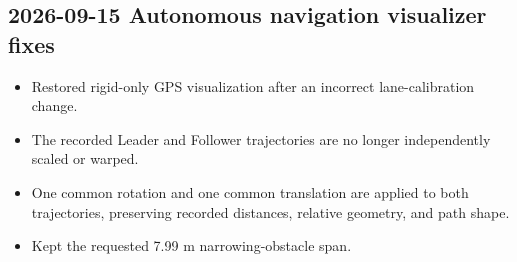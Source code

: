 \documentclass[a4paper]{article}
\title{}
\date{}
\author{Mohammad Rahmani}
\begin{document}
   \begin{preview}
      \section*{2026-09-15 Autonomous navigation visualizer fixes}

      \begin{itemize}
         \item Restored rigid-only GPS visualization after an incorrect lane-calibration change.
         \item The recorded Leader and Follower trajectories are no longer independently scaled or warped.
         \item One common rotation and one common translation are applied to both trajectories, preserving recorded distances, relative geometry, and path shape.
         \item Kept the requested 7.99 m narrowing-obstacle span.
      \end{itemize}
   \end{preview}
\end{document}
